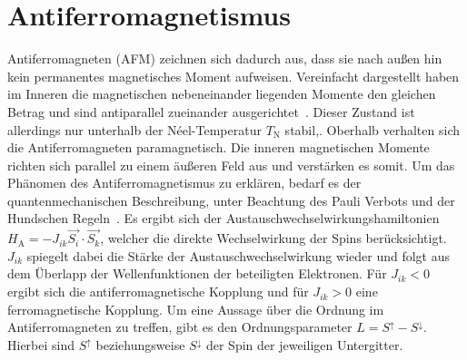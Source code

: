     \section{Antiferromagnetismus} \label{sec:AFM}
        Antiferromagneten (AFM) zeichnen sich dadurch aus, dass sie nach außen hin kein permanentes magnetisches Moment aufweisen.
        Vereinfacht dargestellt haben im Inneren die magnetischen nebeneinander liegenden Momente den gleichen Betrag und sind antiparallel zueinander ausgerichtet~\cite{Suter}.
        Dieser Zustand ist allerdings nur unterhalb der Néel-Temperatur $T_\text{N}$ stabil,.
        Oberhalb verhalten sich die Antiferromagneten paramagnetisch.
        Die inneren magnetischen Momente richten sich parallel zu einem äußeren Feld aus und verstärken es somit.
        Um das Phänomen des Antiferromagnetismus zu erklären, bedarf es der quantenmechanischen Beschreibung, unter Beachtung des Pauli Verbots und der Hundschen Regeln~\cite{TUChemnitz}.
        Es ergibt sich der Austauschwechselwirkungshamiltonien $H_\text{A} = - J_{ik} \vec{S_i}\cdot\vec{S_k}$, welcher die direkte Wechselwirkung der Spins berücksichtigt.
        $J_{ik}$ spiegelt dabei die Stärke der Austauschwechselwirkung wieder und folgt aus dem Überlapp der Wellenfunktionen der beteiligten Elektronen.
        Für $J_{ik} < 0$ ergibt sich die antiferromagnetische Kopplung und für $J_{ik} > 0$ eine ferromagnetische Kopplung.
        Um eine Aussage über die Ordnung im Antiferromagneten zu treffen, gibt es den Ordnungsparameter $L = S^{\uparrow} - S^{\downarrow}$.
        Hierbei sind $S^{\uparrow}$ beziehungsweise $S^{\downarrow}$ der Spin der jeweiligen Untergitter.


